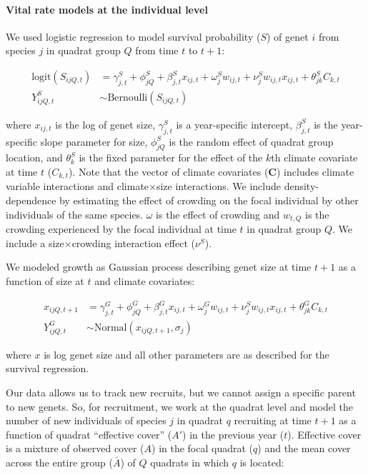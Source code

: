 \documentclass[12pt,]{article}
\begin{document}
\paragraph{Vital rate models at the individual
level}\label{vital-rate-models-at-the-individual-level}

We used logistic regression to model survival probability ($S$) of genet
$i$ from species $j$ in quadrat group $Q$ from time $t$ to $t+1$:

\begin{align}
\text{logit}(S_{ijQ,t}) &= \gamma^{S}_{j,t} + \phi^{S}_{jQ} + \beta^{S}_{j,t}x_{ij,t} + \omega^{S}_{j}w_{ij,t} + \nu^{S}_{j}w_{ij,t}x_{ij,t} + \theta^{S}_{jk}C_{k,t} \\
Y^{S}_{ijQ,t} &\sim \text{Bernoulli}(S_{ijQ,t})
\end{align}

where $x_{ij,t}$ is the log of genet size, $\gamma^{S}_{j,t}$ is a
year-specific intercept, $\beta^{S}_{j,t}$ is the year-specific slope
parameter for size, $\phi^{S}_{jQ}$ is the random effect of quadrat
group location, and $\theta^{S}_{k}$ is the fixed parameter for the
effect of the $k$th climate covariate at time $t$ ($C_{k,t}$). Note that
the vector of climate covariates (\textbf{C}) includes climate variable
interactions and climate$\times$size interactions. We include
density-dependence by estimating the effect of crowding on the focal
individual by other individuals of the same species. $\omega$ is the
effect of crowding and $w_{t,Q}$ is the crowding experienced by the
focal individual at time $t$ in quadrat group $Q$. We include a
size$\times$crowding interaction effect ($\nu^{S}$).

We modeled growth as Gaussian process describing genet size at time
$t+1$ as a function of size at $t$ and climate covariates:

\begin{align}
x_{ijQ,t+1} &= \gamma^{G}_{j,t} + \phi^{G}_{jQ} + \beta^{G}_{j,t}x_{ij,t} + \omega^{G}_{j}w_{ij,t} + \nu^{S}_{j}w_{ij,t}x_{ij,t} + \theta^{G}_{jk}C_{k,t} \\
Y^{G}_{ijQ,t} &\sim \text{Normal}(x_{ijQ,t+1}, \sigma_{j})
\end{align}

where $x$ is log genet size and all other parameters are as described
for the survival regression.

Our data allows us to track new recruits, but we cannot assign a
specific parent to new genets. So, for recruitment, we work at the
quadrat level and model the number of new individuals of species $j$ in
quadrat $q$ recruiting at time $t+1$ as a function of quadrat
``effective cover'' ($A'$) in the previous year ($t$). Effective cover
is a mixture of observed cover ($A$) in the focal quadrat ($q$) and the
mean cover across the entire group ($\bar{A}$) of $Q$ quadrats in which
$q$ is located:
\end{document}
